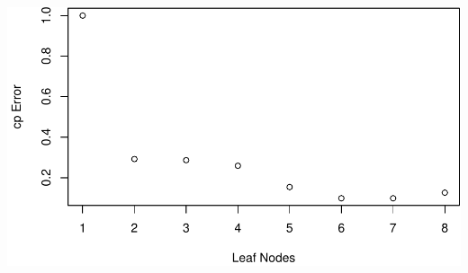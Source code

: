 \documentclass[]{article}
\begin{document}
\includegraphics{HW4_Solution_files/figure-latex/unnamed-chunk-12-1.pdf}

~
\end{document}
